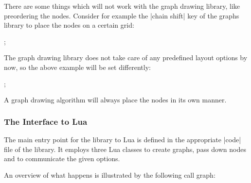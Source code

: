 There are some things which will not work with the graph drawing
library, like preordering the nodes. Consider for example the
|chain shift| key of the graphs library to place the nodes on a
certain grid: 

\begin{codeexample}[]
\tikzpicture
  ;
\endtikzpicture
\end{codeexample}

The graph drawing library does not take care of any predefined layout options by now, so the above example will be set differently:

\begin{codeexample}[]
\tikz[AhrensFKSS2011 minimize crossings, scale=2]
  ;
\end{codeexample}

A graph drawing algorithm will always place the nodes in its own manner. 


\subsubsection{The Interface to Lua}
The main entry point for the library to Lua is defined in the
appropriate |code| file of the library. It employs three Lua classes
to create graphs, pass down nodes and to communicate the given
options.

An overview of what happens is illustrated by the following call graph:

